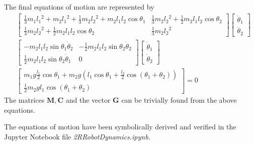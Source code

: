 The final equations of motion are represented by
\begin{align*}
	&\left[\begin{array}{lc}
		\frac{1}{3} m_1 l_1{ }^2+m_2 l_1{ }^2+\frac{1}{3} m_2 l_2{ }^2+m_2 l_1 l_2 \cos \theta_1 & \frac{1}{3} m_2 l_2{ }^2+\frac{1}{2} m_2 l_1 l_2 \cos \theta_2 \\
		\frac{1}{3} m_2 l_2{ }^2+\frac{1}{2} m_2 l_1 l_2 \cos \theta_2 & \frac{1}{3} m_2 l_2{ }^2
	\end{array}\right]\begin{bmatrix}
	\ddot{\theta}_1\\
	\ddot{\theta}_2
\end{bmatrix} \\
& \left[\begin{array}{cc}
	-m_2 l_1 l_2 \sin \theta_1 \dot{\theta}_2 & -\frac{1}{2} m_2 l_1 l_2 \sin \theta_2 \dot{\theta}_2 \\
	\frac{1}{2} m_2 l_1 l_2 \sin \theta_2 \dot{\theta}_1 & 0
\end{array}\right]\begin{bmatrix}
\dot{\theta}_1\\
\dot{\theta}_2
\end{bmatrix} \\ 
& \begin{bmatrix}
	m_1g\frac{l_1}{2}\cos\theta_1 + m_2g\left(l_1\cos\theta_1 + \frac{l_2}{2}\cos\left(\theta_1 + \theta_2\right)\right)\\
	\frac{1}{2}m_2gl_1\cos\left(\theta_1 + \theta_2\right)
\end{bmatrix} = 0
\end{align*}
The matrices $\bm{M}, \bm{C}$ and the vector $\bm{G}$ can be trivially found from the above equations.

The equations of motion have been symbolically derived and verified in the Jupyter Notebook file \emph{2RRobotDynamics.ipynb}.
